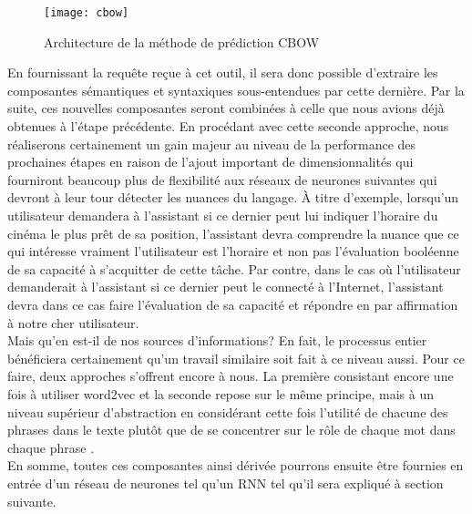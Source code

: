 \begin{figure}[ht]
  \centering
  \texttt{[image: cbow]}
  \caption{Architecture de la méthode de prédiction CBOW}
  \label{fig:cbow}
\end{figure}

En fournissant la requête reçue à cet outil, il sera donc possible d'extraire les composantes sémantiques et syntaxiques sous-entendues par cette dernière. Par la suite, ces nouvelles composantes seront combinées à celle que nous avions déjà obtenues à l'étape précédente. En procédant avec cette seconde approche, nous réaliserons certainement un gain majeur au niveau de la performance des prochaines étapes en raison de l'ajout important de dimensionnalités qui fourniront beaucoup plus de flexibilité aux réseaux de neurones suivantes qui devront à leur tour détecter les nuances du langage. À titre d'exemple, lorsqu'un utilisateur demandera à l'assistant si ce dernier peut lui indiquer l'horaire du cinéma le plus prêt de sa position, l'assistant devra comprendre la nuance que ce qui intéresse vraiment l'utilisateur est l'horaire et non pas l'évaluation booléenne de sa capacité à s'acquitter de cette tâche. Par contre, dans le cas où l'utilisateur demanderait à l'assistant si ce dernier peut le connecté à l'Internet, l'assistant devra dans ce cas faire l'évaluation de sa capacité et répondre en par affirmation à notre cher utilisateur. \\

Mais qu'en est-il de nos sources d'informations? En fait, le processus entier bénéficiera certainement qu'un travail similaire soit fait à ce niveau aussi. Pour ce faire, deux approches s'offrent encore à nous. La première consistant encore une fois à utiliser word2vec et la seconde repose sur le même principe, mais à un niveau supérieur d'abstraction en considérant cette fois l'utilité de chacune des phrases dans le texte plutôt que de se concentrer sur le rôle de chaque mot dans chaque phrase \cite{inferSent}. \\

En somme, toutes ces composantes ainsi dérivée pourrons ensuite être fournies en entrée d'un réseau de neurones tel qu'un RNN tel qu'il sera expliqué à section suivante.
